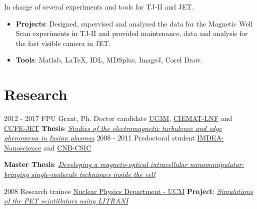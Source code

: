 \documentclass[letterpaper]{twentysecondcv} %
\begin{document}
\begin{twenty}
        {}
        {
        In charge of several experiments and tools for TJ-II and JET.
        \begin{itemize}
            \item \textbf{Projects}: Designed, supervised and analysed the data for the Magnetic Well Scan experiments in TJ-II and provided maintenance, data and analysis for the fast visible camera in JET.
            \item \textbf{Tools}: Matlab, \LaTeX, IDL, MDSplus, ImageJ, Corel Draw.
        \end{itemize}
    	}
        
\end{twenty}

\section{Research}
\begin{twenty}
	\twentyitem
    	{2012 - 2017}
		{}
        {FPU Grant, Ph. Doctor candidate}
        {\href{https://www.uc3m.es/}{UC3M},  \href{http://www.ciemat.es/}{CIEMAT-LNF} and \href{https://www.euro-fusion.org/devices/jet/}{CCFE-JET}}
        {}
        {
       	\textbf{Thesis}: \href{https://e-archivo.uc3m.es/handle/10016/24978}{\emph{Studies of the electromagnetic turbulence and edge phenomena in fusion plasmas}}
        }
    \twentyitem
        {2008 - 2011}
        {}
        {Predoctoral student}
        {\href{http://nanociencia.imdea.org/}{IMDEA-Nanoscience} and \href{http://www.cnb.csic.es/index.php/es/investigacion/departamentos-de-investigacion/estructura-de-macromoleculas}{CNB-CSIC}}
        {}
        {
        \textbf{Master Thesis}: \href{https://drive.google.com/open?id=1oGQjBpotnNVcit9QcrBaTAIsPuv4H9pz}{\emph{Developing a magneto-optical intracellular nanomanipulator: bringing single-molecule techniques inside the cell}}
        \vspace{2mm}

        }
    \twentyitem
        {2008}
        {}
        {Research trainee}
        {\href{http://nuclear.fis.ucm.es/}{Nuclear Physics Department - UCM}}
        {}
        {
        \textbf{Project}: \href{https://drive.google.com/open?id=1hC6z1AJrOAY0hH-OgYCG0hBnCQOkAaPH}{\emph{Simulations of the PET scintillators using LITRANI}}
        }
\end{twenty}

\end{document}

